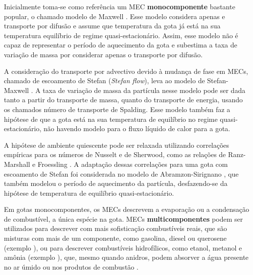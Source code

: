 Inicialmente toma-se como referência um MEC \textbf{monocomponente} bastante popular, o chamado modelo de Maxwell \cite{Fuchs1959,Sazhin2006}.
Esse modelo considera apenas e transporte por difusão e assume que temperatura da gota já está na sua temperatura equilíbrio de regime quasi-estacionário.
Assim, esse modelo não é capaz de representar o período de aquecimento da gota e subestima a taxa de variação de massa por considerar apenas o transporte por difusão.

A consideração do transporte por advectivo devido à mudança de fase em MECs, chamado de escoamento de Stefan (\emph{Stefan flow}), leva ao modelo de Stefan-Maxwell \cite{Law1978}.
A taxa de variação de massa da partícula nesse modelo pode ser dada tanto a partir do transporte de massa, quanto do transporte de energia, usando os chamados número de transporte de Spalding.
Esse modelo também faz a hipótese de que a gota está na sua temperatura de equilíbrio no regime quasi-estacionário, não havendo modelo para o fluxo líquido de calor para a gota.

A hipótese de ambiente quiescente pode ser relaxada utilizando correlações empíricas para os números de Nusselt e de Sherwood, como as relações de Ranz-Marshall e Froessling \cite{Bird2002}. 
A adaptação dessas correlações para uma gota com escoamento de Stefan foi considerada no modelo de Abramzon-Sirignano \cite{Sirignano1989}, que também modelou o período de aquecimento da partícula, desfazendo-se da hipótese de temperatura de equilíbrio quasi-estacionário.


Em gotas monocomponentes, os MECs descrevem a evaporação ou a condensação de combustível, a única espécie na gota.
MECs \textbf{multicomponentes} podem ser utilizados para descrever com mais sofisticação combustíveis reais, que são misturas com mais de um componente, como gasolina, diesel ou querosene (exemplo \cite{FriedrichD2022,ShastryV2021,ShastryV2023,SekularacN2024}), ou para descrever combustíveis hidrofílicos, como etanol, metanol e amônia (exemplo \cite{BojkoDesJardin2017CF,SacomanoF2024CF,SacomanoF2025CF,MaquaC2008,ZanuttoC2019,ChenL2016IJHMT}), que, mesmo quando anidros, podem absorver a água presente no ar úmido ou nos produtos de combustão \cite{SacomanoF2024CF,SacomanoF2025CF}. 

